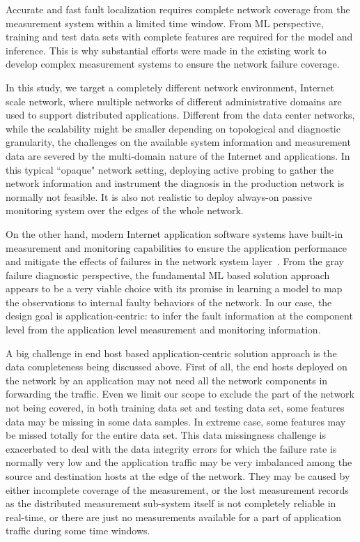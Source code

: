 Accurate and fast fault localization requires complete network coverage from the measurement system within a limited time window. 
From ML perspective, training and test data sets with complete features are required for the model and inference. 
This is why substantial efforts were made in the existing work to develop complex measurement systems to ensure the network failure coverage. 

In this study, we target a completely different network environment, Internet scale network, where multiple networks of different 
administrative domains are used to support distributed applications. Different from the data center networks, while the scalability might be smaller 
depending on topological and diagnostic granularity, the challenges on the available system information and measurement data are 
severed by the multi-domain nature of the Internet and applications. In this typical ``opaque" network setting, deploying active probing 
to gather the network information and instrument the diagnosis in the production network is normally not feasible. It is also not realistic to deploy 
always-on passive monitoring system over the edges of the whole network.
 
On the other hand, modern Internet application software systems have built-in measurement and monitoring capabilities to ensure the application performance 
and mitigate the effects of failures in the network system layer~\cite{IntegrityVerification:DataTransfer,swip:pearc:2019,iris:ictc21}. 
From the gray failure diagnostic perspective, the fundamental ML based solution approach appears to be a very viable choice with its promise in 
learning a model to map the observations to internal faulty behaviors of the network. In our case, the design goal is application-centric: to infer the fault information at the 
component level from the application level measurement and monitoring information. 

A big challenge in end host based application-centric solution approach is the data completeness being discussed above. First of all, the end hosts deployed on the network 
by an application may not need all the network components in forwarding the traffic.  Even we limit our scope to exclude the part of the network not being covered,  
in both training data set and testing data set, some features data may be missing in some data samples. In extreme case, some features may be missed totally for the entire data set. 
This data missingness challenge is exacerbated to deal with the data integrity errors for which the failure rate is normally very low and the application traffic 
may be very imbalanced among the source and destination hosts at the edge of the network.
They may be caused by either incomplete coverage of the measurement, or the lost measurement records as the distributed measurement 
sub-system itself is not completely reliable in real-time, or there are just no measurements available for a part of application traffic during some time windows. 

